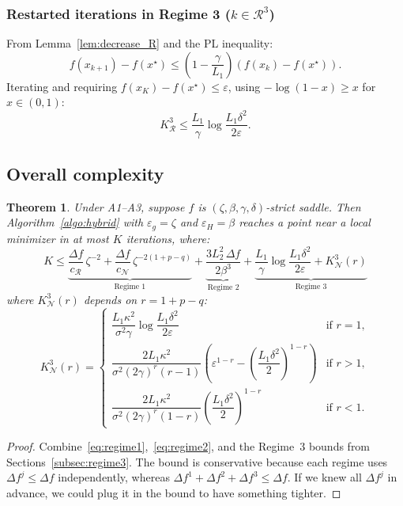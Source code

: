 \documentclass{article}
\newtheorem{theorem}{Theorem}
\begin{document}
\subsubsection{Restarted iterations in Regime 3 ($k \in \mathcal{R}^3$)}

From Lemma~\ref{lem:decrease_R} and the PL inequality:
\[
f(x_{k+1}) - f(x^\star) \leq \left(1 - \frac{\gamma}{L_1}\right)(f(x_k) - f(x^\star)).
\]
Iterating and requiring $f(x_K) - f(x^\star) \leq \varepsilon$, using $-\log(1-x) \geq x$ for $x \in (0,1)$:
\begin{equation}
\label{eq:R3}
K^3_{\mathcal{R}} \leq \frac{L_1}{\gamma}\log\frac{L_1\delta^2}{2\varepsilon}.
\end{equation}

\subsection{Overall complexity}

\begin{theorem}
\label{thm:strict_saddle}
Under A1--A3, suppose $f$ is $(\zeta, \beta, \gamma, \delta)$-strict saddle. Then Algorithm~\ref{algo:hybrid} with $\varepsilon_g = \zeta$ and $\varepsilon_H = \beta$ reaches a point near a local minimizer in at most $K$ iterations, where:
\begin{equation}
\label{eq:total}
\boxed{
K \leq \underbrace{\frac{\Delta f}{c_{\mathcal{R}}}\,\zeta^{-2} + \frac{\Delta f}{c_{\mathcal{N}}}\,\zeta^{-2(1+p-q)}}_{\text{Regime 1}} + \underbrace{\frac{3L_2^2\,\Delta f}{2\beta^3}}_{\text{Regime 2}} + \underbrace{\frac{L_1}{\gamma}\log\frac{L_1\delta^2}{2\varepsilon} + K^3_{\mathcal{N}}(r)}_{\text{Regime 3}}
}
\end{equation}
where $K^3_{\mathcal{N}}(r)$ depends on $r = 1+p-q$:
\[
K^3_{\mathcal{N}}(r) = 
\begin{cases}
\dfrac{L_1\kappa^2}{\sigma^2\gamma}\log\dfrac{L_1\delta^2}{2\varepsilon} & \text{if } r = 1, \\[12pt]
\dfrac{2L_1\kappa^2}{\sigma^2(2\gamma)^r(r-1)}\left(\varepsilon^{1-r} - \left(\dfrac{L_1\delta^2}{2}\right)^{1-r}\right) & \text{if } r > 1, \\[12pt]
\dfrac{2L_1\kappa^2}{\sigma^2(2\gamma)^r(1-r)}\left(\dfrac{L_1\delta^2}{2}\right)^{1-r} & \text{if } r < 1.
\end{cases}
\]
\end{theorem}

\begin{proof}
Combine~\eqref{eq:regime1},~\eqref{eq:regime2}, and the Regime~3 bounds from Sections~\ref{subsec:regime3}. The bound is conservative because each regime 
uses $\Delta f^j \leq \Delta f$ independently, whereas $\Delta f^1 + \Delta f^2 + \Delta f^3 \leq \Delta f$. If we knew all $\Delta f^j$ in advance, we could
plug it in the bound to have something tighter.
\end{proof}
\end{document}
